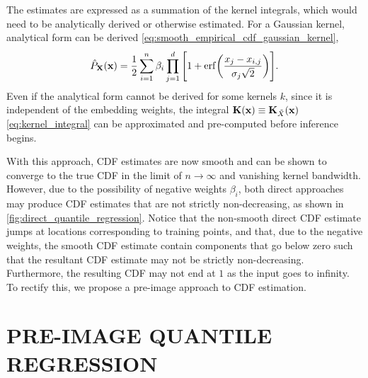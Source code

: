 \documentclass[twoside]{article} \usepackage{aistats2017}
\theoremstyle{definition}
\theoremstyle{theorem}
\newcommand{\rv}[1]{{#1}}
\newcommand{\ds}[1]{\tilde{#1}}
\newcommand{\warn}[1]{{\color{red} #1}}
\begin{document}
		The estimates are expressed as a summation of the kernel integrals, which would need to be analytically derived or otherwise estimated. For a Gaussian kernel, analytical form can be derived \eqref{eq:smooth_empirical_cdf_gaussian_kernel},
		\begin{equation}
			\hat{P}_{\bvec{\rv{X}}}(\bvec{x}) = \frac{1}{2} \sum_{i = 1}^{n} \beta_{i} \prod_{j = 1}^{d} \Bigg[1 + \mathrm{erf}\bigg(\frac{x_{j} - x_{i, j}}{\sigma_{j} \sqrt{2}}\bigg)\Bigg].
		\label{eq:smooth_empirical_cdf_gaussian_kernel}
		\end{equation}
		Even if the analytical form cannot be derived for some kernels $k$, since it is independent of the embedding weights, the integral $\bvec{K}(\bvec{x}) \equiv \bvec{K}_{\ds{X}}(\bvec{x})$ \eqref{eq:kernel_integral} can be approximated and pre-computed before inference begins.

		With this approach, CDF estimates are now smooth and can be shown to converge to the true CDF in the limit of $n \rightarrow \infty$ and vanishing kernel bandwidth. However, due to the possibility of negative weights $\beta_{i}$, both direct approaches may produce CDF estimates that are not strictly non-decreasing, as shown in \cref{fig:direct_quantile_regression}. Notice that the non-smooth direct CDF estimate jumps at locations corresponding to training points, and that, due to the negative weights, the smooth CDF estimate contain components that go below zero such that the resultant CDF estimate may not be strictly non-decreasing. Furthermore, the resulting CDF may not end at $1$ as the input goes to infinity. To rectify this, we propose a pre-image approach to CDF estimation.

\section{PRE-IMAGE QUANTILE REGRESSION}
\label{sec:pre_image_quantile_regression}

	
\end{document}
